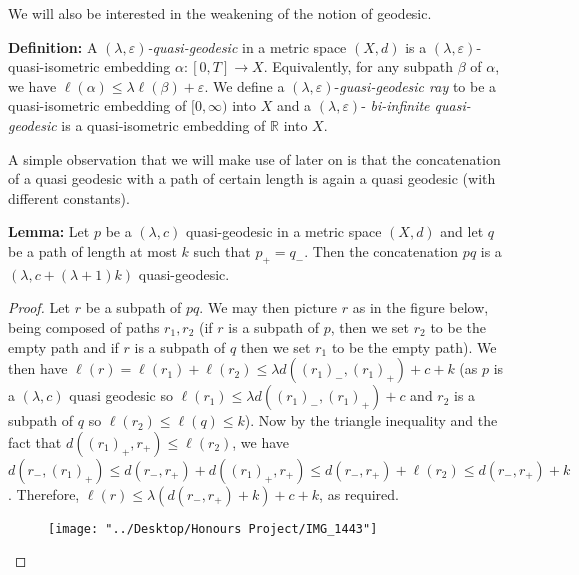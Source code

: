 \documentclass[12pt]{article}
\newcommand{\vs}{\vskip10pt}
\begin{document}
 	\vs 
 	
 	We will also be interested in the weakening of the notion of geodesic. 
 	
 	\vs 
 	
 	\textbf{Definition: } A $(\lambda, \varepsilon)$\textit{-quasi-geodesic} in a metric space $(X,d)$ is a $(\lambda, \varepsilon)$-quasi-isometric embedding $\alpha: [0,T] \rightarrow X$. Equivalently, for any subpath $\beta$ of $\alpha$, we have $\ell(\alpha) \leq \lambda \ell(\beta) + \varepsilon$. We define a $(\lambda, \varepsilon)$-\textit{guasi-geodesic ray} to be a quasi-isometric embedding of $[0, \infty)$ into $X$ and a $(\lambda, \varepsilon)$-\textit{ bi-infinite quasi-geodesic} is a quasi-isometric embedding of $\mathbb{R}$ into $X$. 
 	
 	\vs 
 	
 	A simple observation that we will make use of later on is that the concatenation of a quasi geodesic with a path of certain length is again a quasi geodesic (with different constants). 
 	
 	\vs 
 	
 	\textbf{Lemma: } Let $p$ be a $(\lambda, c)$ quasi-geodesic in a metric space $(X,d)$ and let $q$ be a path of length at most $k$ such that $p_{+} = q_{-}$. Then the concatenation $pq$ is a $(\lambda, c + (\lambda + 1)k)$ quasi-geodesic. 
 	
 	\begin{proof}
 		
 		Let $r$ be a subpath of $pq$. We may then picture $r$ as in the figure below, being composed of paths $r_1, r_2$ (if $r$ is a subpath of $p$, then we set $r_2$ to be the empty path and if $r$ is a subpath of $q$ then we set $r_1$ to be the empty path). We then have $\ell(r) = \ell(r_1) + \ell(r_2) \leq \lambda d((r_1)_{-}, (r_1)_{+}) + c + k$ (as $p$ is a $(\lambda, c)$ quasi geodesic so $\ell(r_1) \leq \lambda d((r_1)_{-}, (r_1)_{+}) + c$ and $r_2$ is a subpath of $q$ so $\ell(r_2) \leq \ell(q) \leq k$). Now by the triangle inequality and the fact that $d((r_1)_+, r_+) \leq \ell(r_2)$, we have $d(r_-, (r_1)_+)  \leq d(r_-, r_+) + d((r_1)_+, r_+) \leq d(r_-, r_+) + \ell(r_2) \leq d(r_-, r_+) + k$. Therefore, $\ell(r) \leq \lambda (d(r_-, r_+) + k) + c + k$, as required. 
 		
 		
 		
\begin{figure} [H]
	\centering
	\texttt{[image: "../Desktop/Honours Project/IMG\_1443"]}
	\caption{}
	\label{fig:img1443}
\end{figure}
 	\end{proof}
 	
\end{document}
